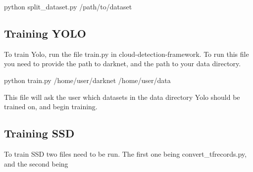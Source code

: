 \begin{lcverbatim}
python split_dataset.py /path/to/dataset
\end{lcverbatim}




\subsection{Training YOLO}
To train Yolo, run the file train.py in cloud-detection-framework. To run this file you need to provide the path to darknet, and the path to your data directory.

\begin{lcverbatim}
python train.py /home/user/darknet /home/user/data
\end{lcverbatim}

\noindent
This file will ask the user which datasets in the data directory Yolo should be trained on, and begin training. 

\subsection{Training SSD}
To train SSD two files need to be run. The first one being convert\_tfrecords.py, and the second being